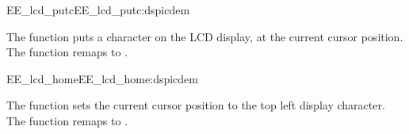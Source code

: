 \begin{function_nopb2}{EE\_lcd\_putc}{EE_lcd_putc:dspicdem}
  
  \begin{fundescription}
    The function puts a character on the LCD display, at the current
    cursor position. The function remaps to
    .
  \end{fundescription}
  
  
  
\end{function_nopb2}


\begin{function_nopb2}{EE\_lcd\_home}{EE_lcd_home:dspicdem}
  
  \begin{fundescription}
    The function sets the current cursor position to the top left
    display character. The function remaps to .
  \end{fundescription}
  
  
  
\end{function_nopb2}

